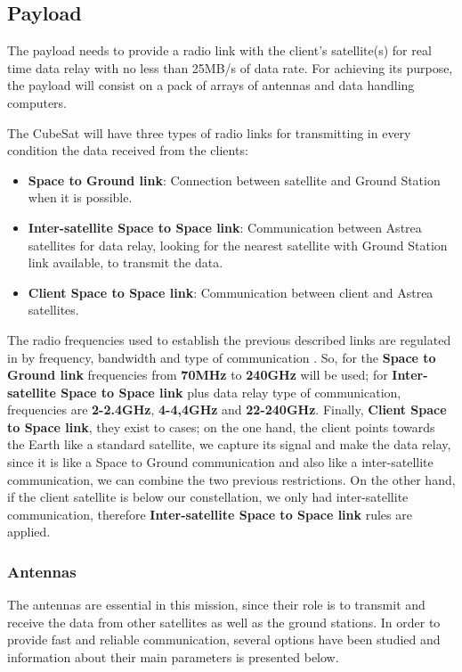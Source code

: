 \subsection{Payload}
The payload needs to provide a radio link with the client's satellite(s) for real time data relay with no less than 25MB/s of data rate. For achieving its purpose, the payload will consist on a pack of arrays of antennas and data handling computers.

The CubeSat will have three types of radio links for transmitting in every condition the data received from the clients:
\begin{itemize}
\item \textbf{Space to Ground link}: Connection between satellite and Ground Station when it is possible.
\item \textbf{Inter-satellite Space to Space link}: Communication between Astrea satellites for data relay, looking for the nearest satellite with Ground Station link available, to transmit the data.
\item \textbf{Client Space to Space link}: Communication between client and Astrea satellites.
\end{itemize}

The radio frequencies used to establish the previous described links are regulated in \cite{SecretariadeEstadodetelecomunicacionesyparalasociedaddelainformacion.2015} by frequency, bandwidth and type of communication . So, for the \textbf{Space to Ground link} frequencies from \textbf{70MHz} to \textbf{240GHz} will be used; for \textbf{Inter-satellite Space to Space link} plus data relay type of communication, frequencies are \textbf{2-2.4GHz}, \textbf{4-4,4GHz} and \textbf{22-240GHz}. Finally, \textbf{Client Space to Space link}, they exist to cases; on the one hand, the client points towards the Earth like a standard satellite, we capture its signal and make the data relay, since it is like a Space to Ground communication and also like a inter-satellite communication, we can combine the two previous restrictions. On the other hand, if the client satellite is below our constellation, we only had inter-satellite communication, therefore \textbf{Inter-satellite Space to Space link} rules are applied.

\subsubsection{Antennas}
The antennas are essential in this mission, since their role is to transmit and receive the data from other satellites as well as the ground stations. In order to provide fast and reliable communication, several options have been studied and information about their main parameters is presented below.

